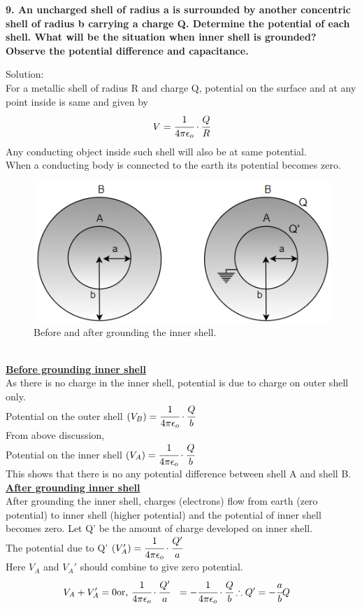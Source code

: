 \newpage
\begin{tcolorbox}
\textbf{9. An uncharged shell of radius a is surrounded by another concentric shell of radius b carrying a charge Q. Determine the potential of each shell. What will be the situation when inner shell is grounded? Observe the potential difference and capacitance.}
\end{tcolorbox}
Solution:\\
For a metallic shell of radius R and charge Q, potential on the surface and at any point inside is same and given by \[ V = \cfrac{1}{4 \pi \epsilon_o}\cdot \cfrac{Q}{R}\]
Any conducting object inside such shell will also be at same potential.\\
When a conducting body is connected to the earth its potential becomes zero.
\begin{figure}[h]
    \centering
    \includegraphics[scale = 0.6]{figures/elecmag/bag.png}
    \caption{Before and after grounding the inner shell.}
    \label{bag}
\end{figure}
\\
\textbf{\underline{Before grounding inner shell}}
\vspace{3pt}
\\
As there is no charge in the inner shell, potential is due to charge on outer shell only. \\
Potential on the outer shell $(V_B) = \cfrac{1}{4 \pi \epsilon_o}\cdot \cfrac{Q}{b}$\\
From above discussion,\\
Potential on the inner shell $(V_A) = \cfrac{1}{4 \pi \epsilon_o}\cdot \cfrac{Q}{b}$
\vspace{3pt}
\\
This shows that there is no any potential difference between shell A and shell B.\\
 \textbf{\underline{After grounding inner shell}}
\vspace{3pt}
\\
After grounding the inner shell, charges (electrons) flow from earth (zero potential) to inner shell (higher potential) and the potential of inner shell becomes zero. Let Q' be the amount of charge developed on inner shell. \\
The potential due to Q' $(V_A') =  \cfrac{1}{4 \pi \epsilon_o}\cdot \cfrac{Q'}{a}$\\
Here $V_A$ and $V_A'$ should combine to give zero potential.
\begin{align*}
   V_A + V_A' &= 0
    \text{or, } \cfrac{1}{4 \pi \epsilon_o}\cdot \cfrac{Q'}{a} &= - \cfrac{1}{4 \pi \epsilon_o}\cdot \cfrac{Q}{b} 
   \therefore Q' &= -\cfrac{a}{b} Q
\end{align*}

